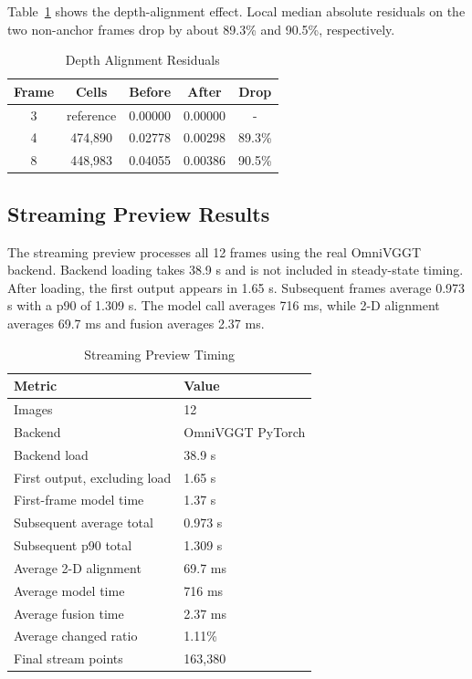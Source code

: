 \documentclass[conference]{IEEEtran}
\begin{document}
Table~\ref{tab:depth} shows the depth-alignment effect. Local median absolute residuals on the two non-anchor frames drop by about 89.3\% and 90.5\%, respectively.

\begin{table}[t]
\centering
\caption{Depth Alignment Residuals}
\label{tab:depth}
\begin{tabular}{ccccc}
\toprule
Frame & Cells & Before & After & Drop \\
\midrule
3 & reference & 0.00000 & 0.00000 & - \\
4 & 474,890 & 0.02778 & 0.00298 & 89.3\% \\
8 & 448,983 & 0.04055 & 0.00386 & 90.5\% \\
\bottomrule
\end{tabular}
\end{table}

\subsection{Streaming Preview Results}
The streaming preview processes all 12 frames using the real OmniVGGT backend. Backend loading takes 38.9 s and is not included in steady-state timing. After loading, the first output appears in 1.65 s. Subsequent frames average 0.973 s with a p90 of 1.309 s. The model call averages 716 ms, while 2-D alignment averages 69.7 ms and fusion averages 2.37 ms.

\begin{table}[t]
\centering
\caption{Streaming Preview Timing}
\label{tab:stream}
\begin{tabular}{ll}
\toprule
Metric & Value \\
\midrule
Images & 12 \\
Backend & OmniVGGT PyTorch \\
Backend load & 38.9 s \\
First output, excluding load & 1.65 s \\
First-frame model time & 1.37 s \\
Subsequent average total & 0.973 s \\
Subsequent p90 total & 1.309 s \\
Average 2-D alignment & 69.7 ms \\
Average model time & 716 ms \\
Average fusion time & 2.37 ms \\
Average changed ratio & 1.11\% \\
Final stream points & 163,380 \\
\bottomrule
\end{tabular}
\end{table}
\end{document}
